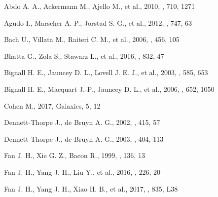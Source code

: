 \documentclass[a4paper,fleqn,usenatbib]{mnras}
\begin{document}



%



\begin{thebibliography}{99}

Abdo A. A., Ackermann M., Ajello M., et al., 2010, \apj, 710, 1271

Agudo I., Marscher A. P., Jorstad S. G., et al., 2012, \apj, 747, 63

Bach U., Villata M., Raiteri C. M., et al., 2006, \aap, 456, 105

Bhatta G., Zola S., Stawarz L., et al., 2016, \apj, 832, 47

Bignall H. E., Jauncey D. L., Lovell J. E. J., et al., 2003, \apj, 585, 653

Bignall H. E., Macquart J.-P., Jauncey D. L., et al., 2006, \apj, 652, 1050

Cohen M., 2017, Galaxies, 5, 12

Dennett-Thorpe J., de Bruyn A. G., 2002, \nat, 415, 57

Dennett-Thorpe J., de Bruyn A. G., 2003, \aap, 404, 113

Fan J. H., Xie G. Z., Bacon R., 1999, \aaps, 136, 13

Fan J. H., Yang J. H., Liu Y., et al., 2016, \apjs, 226, 20

Fan J. H., Yang J. H., Xiao H. B., et al., 2017, \apj, 835, L38


\end{thebibliography}
\end{document}
